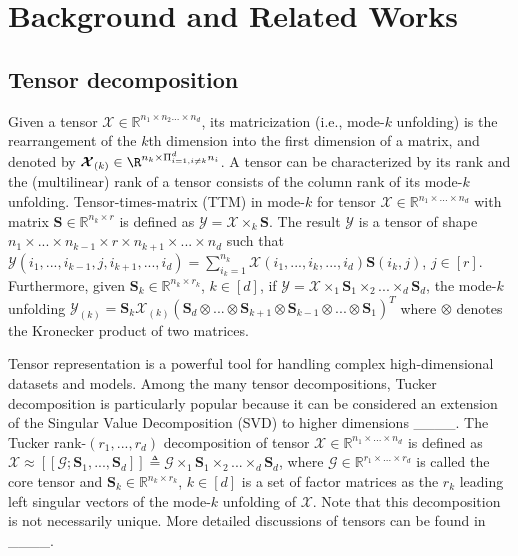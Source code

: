 \section{Background and Related Works}
\subsection{Tensor decomposition}\label{subsection:tensor}
Given a tensor $\boldsymbol{\mathcal{X}} \in \mathbb{R}^{n_1 \times n_2 ... \times n_d}$, its matricization (i.e., mode-$k$ unfolding) is the rearrangement of the $k$th dimension into the first dimension of a matrix, and denoted by $\boldsymbol{\mathcal{X}}_{(k)}\in \R^{n_k \times \Pi_{i=1, i \neq k}^d n_i}$. A tensor can be characterized by its rank and the (multilinear) rank of a tensor consists of the column rank of its mode-$k$ unfolding. Tensor-times-matrix (TTM) in mode-$k$ for tensor $\boldsymbol{\mathcal{X}} \in \mathbb{R}^{n_1 \times ... \times n_d}$ with matrix $\mathbf{S} \in \mathbb{R}^{n_k \times r}$ is defined as $\boldsymbol{\mathcal{Y}} 
 = \boldsymbol{\mathcal{X}} \times_k \mathbf{S}$. The result $\boldsymbol{\mathcal{Y}}$ is a tensor of shape $n_1 \times ... \times n_{k-1} \times r \times n_{k+1} \times ... \times n_d$ such that $\mathcal{Y}(i_1, ..., i_{k-1}, j, i_{k+1}, ..., i_d) = \sum_{i_k = 1}^{n_k} \mathcal{X}(i_1, ..., i_k, ..., i_d) \mathbf{S}(i_k, j)$, $j \in [r]$.
Furthermore, given $\mathbf{S}_k \in \mathbb{R}^{n_k \times r_k}$, $k\in[d]$, if $\boldsymbol{\mathcal{Y}} = \boldsymbol{\mathcal{X}} \times_1 \mathbf{S}_1 \times_2 ... \times_d \mathbf{S}_d$, the mode-$k$ unfolding $
\boldsymbol{\mathcal{Y}}_{(k)} = \mathbf{S}_k \boldsymbol{\mathcal{X}}_{(k)}(\mathbf{S}_d \otimes ... \otimes \mathbf{S}_{k+1}\otimes \mathbf{S}_{k-1} \otimes ... \otimes \mathbf{S}_1)^T
$ where $\otimes$ denotes the Kronecker product of two matrices. 

Tensor representation is a powerful tool for handling complex high-dimensional datasets and models. Among the many tensor decompositions, Tucker decomposition is particularly popular because it can be considered an extension of the Singular Value Decomposition (SVD) to higher dimensions ____. 
The Tucker rank-$(r_1, ..., r_d)$ decomposition of tensor $\boldsymbol{\mathcal{X}} \in \mathbb{R}^{n_1 \times ... \times n_d}$ is defined as 
$\boldsymbol{\mathcal{X}} \approx [\![\boldsymbol{\mathcal{G}}; \mathbf{S}_1, ..., \mathbf{S}_d]\!]\triangleq \boldsymbol{\mathcal{G}} \times_1 \mathbf{S}_1 \times_2 ... \times_d \mathbf{S}_d$, where $\boldsymbol{\mathcal{G}} \in \mathbb{R}^{r_1 \times ... \times r_d}$ is called the core tensor and  $\mathbf{S}_k \in \mathbb{R}^{n_k \times r_k}$, $k \in [d]$ is a set of factor matrices as the $r_k$ leading left singular vectors of the mode-$k$ unfolding of $\boldsymbol{\mathcal{X}}$. 
Note that this decomposition is not necessarily unique. More detailed discussions of tensors can be found in ____. 

